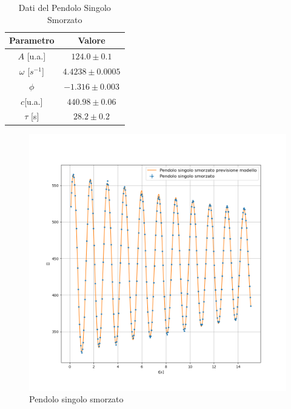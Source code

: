 \documentclass{article}
\begin{document}
                \begin{table}[h! ]
                        \centering
                        \caption{Dati del Pendolo Singolo Smorzato}
                        \begin{tabular}{|c|c|}
                        \hline
                        Parametro & Valore \\
                        \hline
                        $A $ [u.a.] & $124.0 \pm 0.1$ \\
                        $\omega$ [$s^{-1}$]& $4.4238 \pm 0.0005$ \\
                        $\phi$& $-1.316 \pm 0.003$ \\
                        $c$[u.a.] & $440.98 \pm 0.06$ \\
                        $\tau$ [s]& $28.2 \pm 0.2$\\
                        \hline
                        \end{tabular}
                        
                        \label{tab:pm}
                       
                \end{table}



            \begin{figure}[h! ]
                \centering
                \includegraphics[width=1\linewidth]{Pendolo singolo smorzato.png}
                \caption{Pendolo singolo smorzato}
                \label{fig:pm}
            \end{figure}
            
\end{document}
